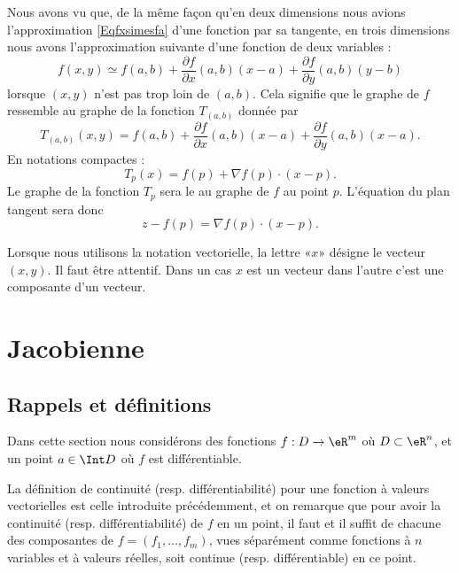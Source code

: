 Nous avons vu que, de la même façon qu'en deux dimensions nous avions l'approximation \eqref{Eqfxsimesfa} d'une fonction par sa tangente, en trois dimensions nous avons l'approximation suivante d'une fonction de deux variables :
\begin{equation}
	f(x,y)\simeq f(a,b)+\frac{ \partial f }{ \partial x }(a,b)(x-a)+\frac{ \partial f }{ \partial y }(a,b)(y-b)
\end{equation}
lorsque $(x,y)$ n'est pas trop loin de $(a,b)$. Cela signifie que le graphe de $f$ ressemble au graphe de la fonction $T_{(a,b)}$ donnée par
\begin{equation}
	T_{(a,b)}(x,y)=f(a,b)+\frac{ \partial f }{ \partial x }(a,b)(x-a)+\frac{ \partial f }{ \partial y }(a,b)(x-a).
\end{equation}
En notations compactes :
\begin{equation}
	T_p(x)=f(p)+\nabla f(p)\cdot (x-p).
\end{equation}
Le graphe de la fonction $T_p$ sera le  au graphe de $f$ au point $p$. L'équation du plan tangent sera donc
\begin{equation}
	z-f(p)=\nabla f(p)\cdot (x-p).
\end{equation}

\begin{remark}
	Lorsque nous utilisons la notation vectorielle, la lettre «$x$» désigne le vecteur $(x,y)$. Il faut être attentif. Dans un cas $x$ est un vecteur dans l'autre c'est une composante d'un vecteur.
\end{remark}

\section{Jacobienne}

\subsection{Rappels et définitions}

Dans cette section nous considérons des fonctions $f : D \to \eR^m$
où $D \subset \eR^n$, et un point $a \in \Int D$ où $f$ est
différentiable.
\begin{remark}
	La définition de continuité (resp. différentiabilité) pour une
	fonction à valeurs vectorielles est celle introduite précédemment,
	et on remarque que pour avoir la continuité
	(resp. différentiabilité) de $f$ en un point, il faut et il suffit
	de chacune des composantes de $f = (f_1,\ldots, f_m)$, vues
	séparément comme fonctions à $n$ variables et à valeurs réelles,
	soit continue (resp. différentiable) en ce point.
\end{remark}

